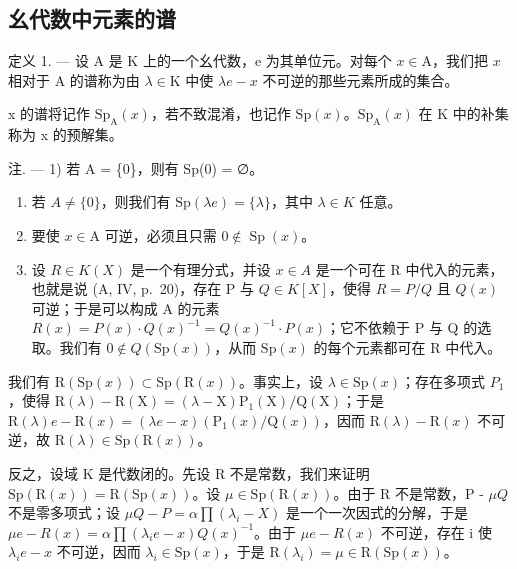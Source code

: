 \subsection{幺代数中元素的谱}

定义 1. --- 设 A 是 K 上的一个幺代数，e 为其单位元。对每个 \(x \in \mathrm{A}\)，我们把 \(x\) 相对于 A 的谱称为由 \(\lambda \in \mathrm{K}\) 中使 \(\lambda e - x\) 不可逆的那些元素所成的集合。

x 的谱将记作 \(\mathrm{Sp}_{\mathrm{A}}(x)\)，若不致混淆，也记作 \(\mathrm{Sp}(x)\)。\(\mathrm{Sp}_{\mathrm{A}}(x)\) 在 K 中的补集称为 x 的预解集。

注. --- 1) 若 A = \{0\}，则有 Sp(0) = ∅。

\begin{enumerate}
\def\labelenumi{\arabic{enumi})}
\setcounter{enumi}{1}
\item
  若 \(A \neq \{0\}\)，则我们有 \(\mathrm{Sp}(\lambda e) = \{\lambda\}\)，其中 \(\lambda \in K\) 任意。
\item
  要使 \(x \in \mathrm{A}\) 可逆，必须且只需 \(0 \notin \operatorname{Sp}(x)\)。
\item
  设 \(R \in K(X)\) 是一个有理分式，并设 \(x \in A\) 是一个可在 R 中代入的元素，也就是说 (A, IV, p.~20)，存在 P 与 \(Q \in K[X]\)，使得 \(R = P/Q\) 且 \(Q(x)\) 可逆；于是可以构成 A 的元素 \(R(x) = P(x) \cdot Q(x)^{-1} = Q(x)^{-1} \cdot P(x)\)；它不依赖于 P 与 Q 的选取。我们有 \(0 \notin Q(\mathrm{Sp}(x))\)，从而 \(\mathrm{Sp}(x)\) 的每个元素都可在 R 中代入。
\end{enumerate}

我们有 \(\mathrm{R}(\mathrm{Sp}(x)) \subset \mathrm{Sp}(\mathrm{R}(x))\)。事实上，设 \(\lambda \in \mathrm{Sp}(x)\)；存在多项式 \(P_{1}\)，使得 \(\mathrm{R}(\lambda) - \mathrm{R}(\mathrm{X}) = (\lambda - \mathrm{X})\mathrm{P}_{1}(\mathrm{X}) / \mathrm{Q}(\mathrm{X})\)；于是 \(\mathrm{R}(\lambda)e - \mathrm{R}(x) = (\lambda e - x)(\mathrm{P}_{1}(x)/\mathrm{Q}(x))\)，因而 \(\mathrm{R}(\lambda) - \mathrm{R}(x)\) 不可逆，故 \(\mathrm{R}(\lambda) \in \mathrm{Sp}(\mathrm{R}(x))\)。

反之，设域 K 是代数闭的。先设 R 不是常数，我们来证明 \(\mathrm{Sp}(\mathrm{R}(x)) = \mathrm{R}(\mathrm{Sp}(x))\)。设 \(\mu \in \mathrm{Sp}(\mathrm{R}(x))\)。由于 R 不是常数，P - \(\mu Q\) 不是零多项式；设 \(\mu Q - P = \alpha \prod (\lambda_i - X)\) 是一个一次因式的分解，于是 \(\mu e - R(x) = \alpha \prod (\lambda_i e - x) Q(x)^{-1}\)。由于 \(\mu e - R(x)\) 不可逆，存在 i 使 \(\lambda_i e - x\) 不可逆，因而 \(\lambda_i \in \mathrm{Sp}(x)\)，于是 \(\mathrm{R}(\lambda_i) = \mu \in \mathrm{R}(\mathrm{Sp}(x))\)。


